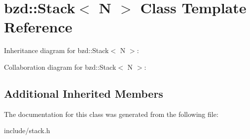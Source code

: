 \hypertarget{classbzd_1_1Stack}{}\section{bzd\+:\+:Stack$<$ N $>$ Class Template Reference}
\label{classbzd_1_1Stack}


Inheritance diagram for bzd\+:\+:Stack$<$ N $>$\+:


Collaboration diagram for bzd\+:\+:Stack$<$ N $>$\+:
\subsection*{Additional Inherited Members}


The documentation for this class was generated from the following file\+:\begin{DoxyCompactItemize}
\item 
include/stack.\+h\end{DoxyCompactItemize}

